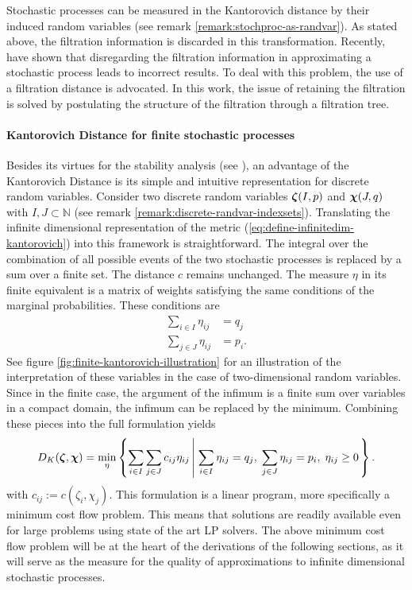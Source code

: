 Stochastic processes can be measured in the Kantorovich distance by their induced random variables (see remark \ref{remark:stochproc-as-randvar}).
As stated above, the filtration information is discarded in this transformation.
Recently,  have shown that disregarding the filtration information in approximating a stochastic process leads to incorrect results.
To deal with this problem, the use of a filtration distance is advocated.
In this work, the issue of retaining the filtration is solved by postulating the structure of the filtration through a filtration tree.
\paragraph{Kantorovich Distance for finite stochastic processes}
Besides its virtues for the stability analysis (see ), an advantage of the Kantorovich Distance is its simple and intuitive representation for discrete random variables.
Consider two discrete random variables $\boldsymbol\zeta(I, p)$ and $\boldsymbol\chi(J,q)$ with $I,J\subset\mathbb{N}$ (see remark \ref{remark:discrete-randvar-indexsets}).
Translating the infinite dimensional representation of the metric (\ref{eq:define-infinitedim-kantorovich}) into this framework is straightforward.
The integral over the combination of all possible events of the two stochastic processes is replaced by a sum over a finite set.
The distance $c$ remains unchanged.
The measure $\eta$ in its finite equivalent is a matrix of weights satisfying the same conditions of the marginal probabilities.
These conditions are
\begin{align}
  \label{eq:finitedim-marginals-eta}
  \sum_{i\in I} \eta_{ij} &= q_j\\
  \sum_{j\in J} \eta_{ij} &= p_i.
\end{align}
See figure \ref{fig:finite-kantorovich-illustration} for an illustration of the interpretation of these variables in the case of two-dimensional random variables.
Since in the finite case, the argument of the infimum is a finite sum over variables in a compact domain, the infimum can be replaced by the minimum.
Combining these pieces into the full formulation yields
\begin{equation}
  \label{eq:define-finitedim-Kantorovich}
  D_K(\boldsymbol\zeta, \boldsymbol\chi) = \min\limits_{\eta}\left\{\sum_{i\in I}\sum_{j\in J}c_{ij} \eta_{ij}\left|\; \sum_{i\in I}\eta_{ij}=q_j,\;\sum_{j\in J}\eta_{ij}=p_i,\;\eta_{ij}\geq 0\right.\right\}.
\end{equation}
with $c_{ij}:=c(\zeta_i,\chi_j)$.
This formulation is a linear program, more specifically a minimum cost flow problem.
This means that solutions are readily available even for large problems using state of the art LP solvers.
The above minimum cost flow problem will be at the heart of the derivations of the following sections, as it will serve as the measure for the quality of approximations to infinite dimensional stochastic processes.

